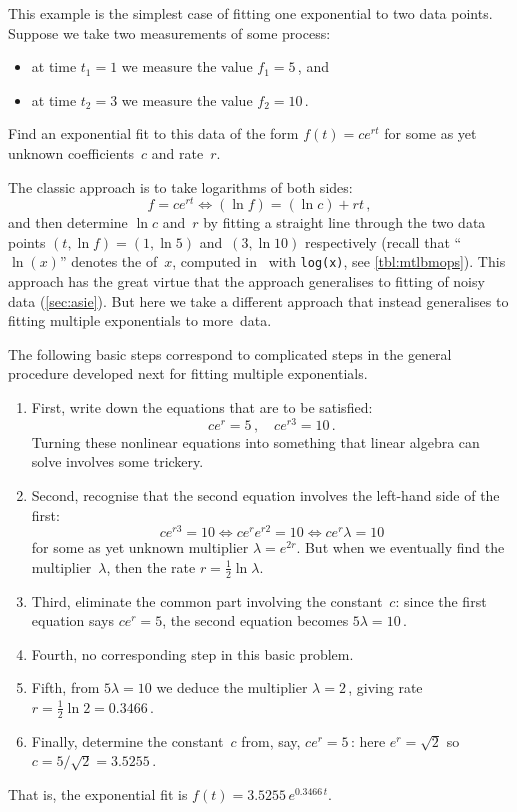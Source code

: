 \begin{example} \label{eg:eidd1}
This example is the simplest case of fitting one exponential to two data points.
Suppose we take two measurements of some process: 
\begin{itemize}
\item at time \(t_1=1\) we measure the value \(f_1=5\)\,, and 
\item at time \(t_2=3\) we measure the value \(f_2=10\)\,.
\end{itemize}
Find an exponential fit to this data of the form \(f(t)=ce^{rt}\) for some as yet unknown coefficients~\(c\) and rate~\(r\).
\begin{solution} 
The classic approach is to take logarithms of both sides:
\begin{equation*}
f=ce^{rt} \iff (\ln f)=(\ln c)+rt\,,
\end{equation*}
and then determine \(\ln c\) and~\(r\) by fitting a straight line through the two data points \((t,\ln f)=(1,\ln5)\) and~\((3,\ln10)\) respectively
(recall that ``\(\ln(x)\)'' denotes the  of~\(x\),  computed in \script\ with \verb|log(x)|, see \autoref{tbl:mtlbmops}).
This approach has the great virtue that the approach generalises to fitting of noisy data (\autoref{sec:asie}).
But here we take a different approach that instead generalises to fitting multiple exponentials to more~data.

The following basic steps correspond to complicated steps in the general procedure developed next for fitting multiple exponentials.
\begin{enumerate}
\item First, write down the equations that are to be satisfied:
\begin{equation*}
ce^{r}=5\,,\quad ce^{r3}=10\,.
\end{equation*}
Turning these nonlinear equations into something that linear algebra  can solve involves some trickery.
\item Second, recognise that the second equation involves the left-hand side of the first:
\begin{equation*}
ce^{r3}=10 \iff ce^re^{r2}=10\iff ce^r\lambda=10
\end{equation*}
for some as yet unknown multiplier \(\lambda=e^{2r}\).
But when we eventually find the multiplier~\(\lambda\), then the rate \(r=\tfrac12\ln\lambda\).
\item Third, eliminate the common part involving the constant~\(c\): since the first equation says \(ce^r=5\), the second equation becomes \(5\lambda=10\)\,.
\item Fourth, no corresponding step in this basic problem.
\item Fifth, from \(5\lambda=10\) we deduce the multiplier \(\lambda=2\)\,, giving rate \(r=\tfrac12\ln 2=0.3466\)\,.
\item Finally, determine the constant~\(c\) from, say, \(ce^r=5\)\,:
here \(e^r=\sqrt2\) so \(c=5/\sqrt2=3.5255\)\,.
\end{enumerate}
That is, the exponential fit is \(f(t)=3.5255\,e^{0.3466\,t}\).
\end{solution}
\end{example}


